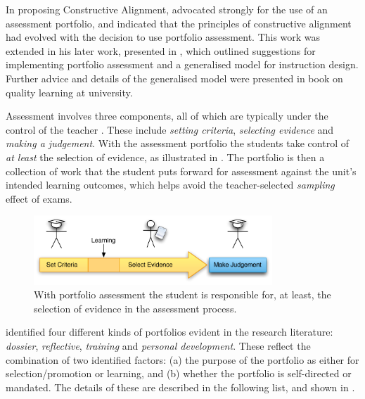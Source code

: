 In proposing Constructive Alignment, \citet{Biggs:1996c} advocated strongly for the use of an assessment portfolio, and indicated that the principles of constructive alignment had evolved with the decision to use portfolio assessment. This work was extended in his later work, presented in \cite{Biggs:1997}, which outlined suggestions for implementing portfolio assessment and a generalised model for instruction design. Further advice and details of the generalised model were presented in \citet{Biggs:2007} book on quality learning at university.

Assessment involves three components, all of which are typically under the control of the teacher \cite{Biggs:1997}. These include \emph{setting criteria}, \emph{selecting evidence} and \emph{making a judgement}. With the assessment portfolio the students take control of \emph{at least} the selection of evidence, as illustrated in . The portfolio is then a collection of work that the student puts forward for assessment against the unit's intended learning outcomes, which helps avoid the teacher-selected \emph{sampling} effect of exams.

\begin{figure}[htbp]
	\centering
	\includegraphics[width=0.8\textwidth]{SelectEvidence}
	\caption{With portfolio assessment the student is responsible for, at least, the selection of evidence in the assessment process.}
	\label{fig:select_evidence}
\end{figure}

%
% 

\citet{Smith:2001,Smith:2003} identified four different kinds of portfolios evident in the research literature: \emph{dossier}, \emph{reflective}, \emph{training} and \emph{personal development}. These reflect the combination of two identified factors: (a) the purpose of the portfolio as either for selection/promotion or learning, and (b) whether the portfolio is self-directed or mandated. The details of these are described in the following list, and shown in .

